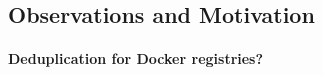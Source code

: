 \subsection{Observations and Motivation} %
\label{sec:background}


%
%
%
%

\paragraph{Deduplication for Docker registries?}




